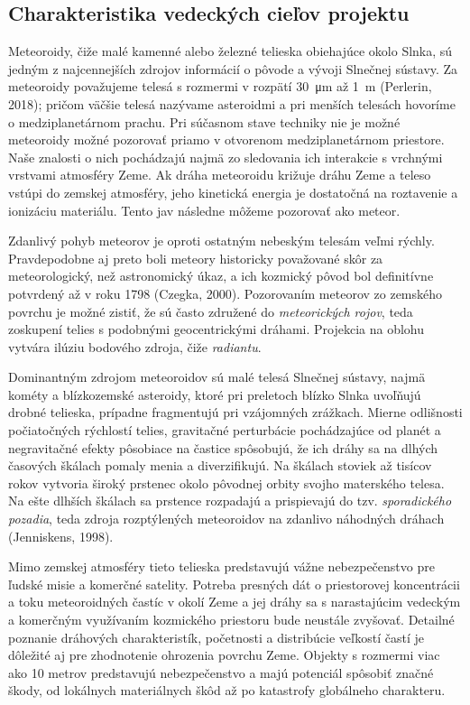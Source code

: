 \subsection{Charakteristika vedeckých cieľov
projektu}\label{charakteristika-vedeckuxfdch-cieux13eov-projektu}

Meteoroidy, čiže malé kamenné alebo železné telieska obiehajúce okolo
Slnka, sú jedným z najcennejších zdrojov informácií o pôvode a vývoji
Slnečnej sústavy. Za meteoroidy považujeme telesá s rozmermi v rozpätí
\SI{30}{\micro\metre} až \SI{1}{\metre} (Perlerin, 2018); pričom väčšie
telesá nazývame asteroidmi a pri menších telesách hovoríme o
medziplanetárnom prachu. Pri súčasnom stave techniky nie je možné
meteoroidy možné pozorovať priamo v otvorenom medziplanetárnom
priestore. Naše znalosti o nich pochádzajú najmä zo sledovania ich
interakcie s vrchnými vrstvami atmosféry Zeme. Ak dráha meteoroidu
križuje dráhu Zeme a teleso vstúpi do zemskej atmosféry, jeho kinetická
energia je dostatočná na roztavenie a ionizáciu materiálu. Tento jav
následne môžeme pozorovať ako meteor.

Zdanlivý pohyb meteorov je oproti ostatným nebeským telesám veľmi
rýchly. Pravdepodobne aj preto boli meteory historicky považované skôr
za meteorologický, než astronomický úkaz, a ich kozmický pôvod bol
definitívne potvrdený až v roku 1798 (Czegka, 2000). Pozorovaním
meteorov zo zemského povrchu je možné zistiť, že sú často združené do
\emph{meteorických rojov}, teda zoskupení telies s podobnými
geocentrickými dráhami. Projekcia na oblohu vytvára ilúziu bodového
zdroja, čiže \emph{radiantu}.

Dominantným zdrojom meteoroidov sú malé telesá Slnečnej sústavy, najmä
kométy a blízkozemské asteroidy, ktoré pri preletoch blízko Slnka
uvoľňujú drobné telieska, prípadne fragmentujú pri vzájomných zrážkach.
Mierne odlišnosti počiatočných rýchlostí telies, gravitačné perturbácie
pochádzajúce od planét a negravitačné efekty pôsobiace na častice
spôsobujú, že ich dráhy sa na dlhých časových škálach pomaly menia a
diverzifikujú. Na škálach stoviek až tisícov rokov vytvoria široký
prstenec okolo pôvodnej orbity svojho materského telesa. Na ešte dlhších
škálach sa prstence rozpadajú a prispievajú do tzv. \emph{sporadického
pozadia}, teda zdroja rozptýlených meteoroidov na zdanlivo náhodných
dráhach (Jenniskens, 1998).

Mimo zemskej atmosféry tieto telieska predstavujú vážne nebezpečenstvo
pre ľudské misie a komerčné satelity. Potreba presných dát o
priestorovej koncentrácii a toku meteoroidných častíc v okolí Zeme a jej
dráhy sa s narastajúcim vedeckým a komerčným využívaním kozmického
priestoru bude neustále zvyšovať. Detailné poznanie dráhových
charakteristík, početnosti a distribúcie veľkostí častí je dôležité aj
pre zhodnotenie ohrozenia povrchu Zeme. Objekty s rozmermi viac ako 10
metrov predstavujú nebezpečenstvo a majú potenciál spôsobiť značné
škody, od lokálnych materiálnych škôd až po katastrofy globálneho
charakteru.

